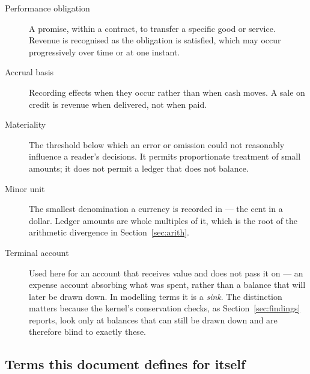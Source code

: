 \documentclass[11pt,a4paper]{article}
\begin{document}
\begin{description}
\item[Performance obligation] A promise, within a contract, to transfer a specific good or service. Revenue is recognised as the obligation is satisfied, which may occur progressively over time or at one instant.
\item[Accrual basis] Recording effects when they occur rather than when cash moves. A sale on credit is revenue when delivered, not when paid.
\item[Materiality] The threshold below which an error or omission could not reasonably influence a reader's decisions. It permits proportionate treatment of small amounts; it does not permit a ledger that does not balance.
\item[Minor unit] The smallest denomination a currency is recorded in --- the cent in a dollar. Ledger amounts are whole multiples of it, which is the root of the arithmetic divergence in Section~\ref{sec:arith}.
\item[Terminal account] Used here for an account that receives value and does not pass it on --- an expense account absorbing what was spent, rather than a balance that will later be drawn down. In modelling terms it is a \emph{sink}. The distinction matters because the kernel's conservation checks, as Section~\ref{sec:findings} reports, look only at balances that can still be drawn down and are therefore blind to exactly these.
\end{description}

\subsection{Terms this document defines for itself}
\end{document}
